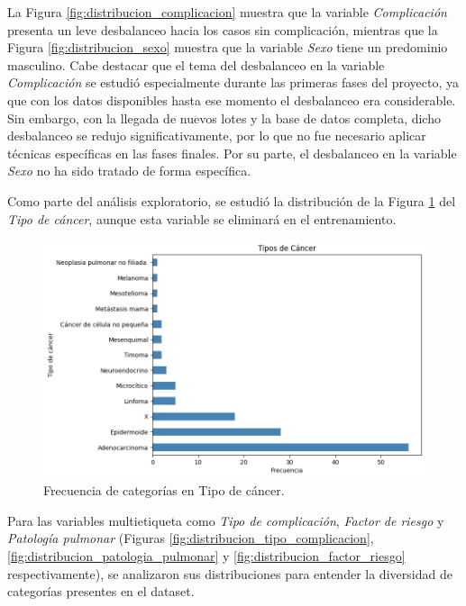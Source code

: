 La Figura \ref{fig:distribucion_complicacion} muestra que la variable \textit{Complicación} presenta un leve desbalanceo hacia los casos sin complicación, mientras que la Figura \ref{fig:distribucion_sexo} muestra que la variable \textit{Sexo} tiene un predominio masculino. Cabe destacar que el tema del desbalanceo en la variable \textit{Complicación} se estudió especialmente durante las primeras fases del proyecto, ya que con los datos disponibles hasta ese momento el desbalanceo era considerable. Sin embargo, con la llegada de nuevos lotes y la base de datos completa, dicho desbalanceo se redujo significativamente, por lo que no fue necesario aplicar técnicas específicas en las fases finales. Por su parte, el desbalanceo en la variable \textit{Sexo} no ha sido tratado de forma específica.

Como parte del análisis exploratorio, se estudió la distribución de la Figura \ref{fig:distribucion_tipo_cancer} del \textit{Tipo de cáncer}, aunque esta variable se eliminará en el entrenamiento. 

\begin{figure}[!htbp]
    \centering
    \includegraphics[width=1\textwidth]{img/barras_tipo_cancer.png}
    \caption{Frecuencia de categorías en Tipo de cáncer.}
    \label{fig:distribucion_tipo_cancer}
\end{figure}
 

Para las variables multietiqueta como \textit{Tipo de complicación}, \textit{Factor de riesgo} y \textit{Patología pulmonar} (Figuras  \ref{fig:distribucion_tipo_complicacion}, \ref{fig:distribucion_patologia_pulmonar} y \ref{fig:distribucion_factor_riesgo} respectivamente), se analizaron sus distribuciones para entender la diversidad de categorías presentes en el dataset. 


